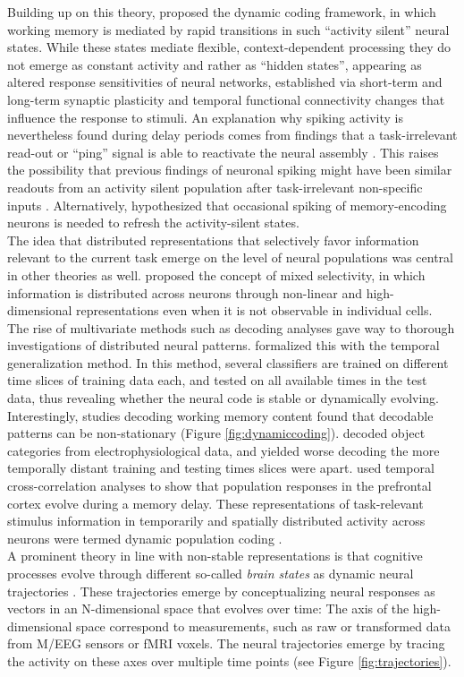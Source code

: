 Building up on this theory,  \citet{stokes2015activity} proposed the dynamic coding framework, in which working memory is mediated by rapid transitions in such ``activity silent'' neural states.
While these states mediate flexible, context-dependent processing they do not emerge as constant activity and rather as ``hidden states'', appearing as altered response sensitivities of neural networks, established via short-term and long-term synaptic plasticity and temporal functional connectivity changes that influence the response to stimuli.
An explanation why spiking activity is nevertheless found during delay periods comes from findings that a task-irrelevant read-out or ``ping'' signal is able to reactivate the neural assembly \citep{trubutschek2017theory}.
This raises the possibility that previous findings of neuronal spiking might have been similar readouts from an activity silent population after task-irrelevant non-specific inputs \citep{wolff2017dynamic}.
Alternatively, \citet{fiebig2017spiking} hypothesized that occasional spiking of memory-encoding neurons is needed to refresh the activity-silent states.\\
The idea that distributed representations that selectively favor information relevant to the current task emerge on the level of neural populations was central in other theories as well.
\citet{rigotti2013importance} proposed the concept of mixed selectivity, in which information is distributed across neurons through non-linear and high-dimensional representations even when it is not observable in individual cells.
The rise of multivariate methods such as decoding analyses gave way to thorough investigations of distributed neural patterns.
\citet{king2014characterizing} formalized this with the temporal generalization method.
In this method, several classifiers are trained on different time slices of training data each, and tested on all available times in the test data, thus revealing whether the neural code is stable or dynamically evolving.
Interestingly, studies decoding working memory content found that decodable patterns can be non-stationary (Figure \ref{fig:dynamiccoding}).
\citet{meyers2008dynamic} decoded object categories from electrophysiological data, and yielded worse decoding the more temporally distant training and testing times slices were apart.
\citet{stokes2013dynamic} used temporal cross-correlation analyses to show that population responses in the prefrontal cortex evolve during a memory delay.
These representations of task-relevant stimulus information in temporarily and spatially distributed activity across neurons were termed dynamic population coding \citep{sreenivasan2014revisiting}.\\
A prominent theory in line with non-stable representations is that cognitive processes evolve through different so-called \textit{brain states} as dynamic neural trajectories \citep{buonomano2009state}.
These trajectories emerge by conceptualizing neural responses as vectors in an N-dimensional space that evolves over time:
The axis of the high-dimensional space correspond to measurements, such as raw or transformed data from M/EEG sensors or \gls{fMRI} voxels.
The neural trajectories emerge by tracing the activity on these axes over multiple time points (see Figure \ref{fig:trajectories}).


